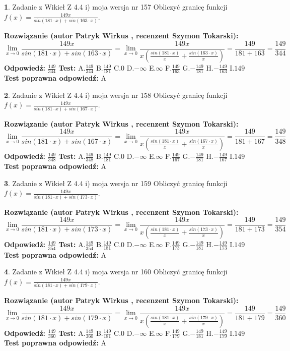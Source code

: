 \documentclass[12pt, a4paper]{article}
\theoremstyle{definition} %
\newtheorem{zad}{}
\newcommand{\zadStart}[1]{\begin{zad}#1\newline}
\newcommand{\zadStop}{\end{zad}}
\newcommand{\rozwStart}[2]{\noindent \textbf{Rozwiązanie (autor #1 , recenzent #2): }\newline}
\newcommand{\rozwStop}{\newline}
\newcommand{\odpStart}{\noindent \textbf{Odpowiedź:}\newline}
\newcommand{\odpStop}{\newline}
\newcommand{\testStart}{\noindent \textbf{Test:}\newline}
\newcommand{\testStop}{\newline}
\newcommand{\kluczStart}{\noindent \textbf{Test poprawna odpowiedź:}\newline}
\newcommand{\kluczStop}{\newline}
\begin{document}
\zadStart{Zadanie z Wikieł Z 4.4 i) moja wersja nr 157}
Obliczyć granicę funkcji $f(x)=\frac{149x}{sin(181\cdot x) +sin(163\cdot x)}$.
\zadStop
\rozwStart{Patryk Wirkus}{Szymon Tokarski}
$$\lim\limits_{x\to 0}\frac{149x}{sin(181\cdot x) +sin(163\cdot x)}=\lim\limits_{x\to 0}\frac{149x}{x(\frac{sin(181\cdot x)}{x}+\frac{sin(163\cdot x)}{x})}=\frac{149}{181+163} = \frac{149}{344}$$
\rozwStop
\odpStart
$\frac{149}{344}$
\odpStop
\testStart
A.$\frac{149}{344}$
B.$\frac{149}{181}$
C.$0$
D.$-\infty$
E.$\infty$
F.$\frac{149}{163}$
G.$-\frac{149}{181}$
H.$-\frac{149}{163}$
I.$149$
\testStop
\kluczStart
A
\kluczStop



\zadStart{Zadanie z Wikieł Z 4.4 i) moja wersja nr 158}
Obliczyć granicę funkcji $f(x)=\frac{149x}{sin(181\cdot x) +sin(167\cdot x)}$.
\zadStop
\rozwStart{Patryk Wirkus}{Szymon Tokarski}
$$\lim\limits_{x\to 0}\frac{149x}{sin(181\cdot x) +sin(167\cdot x)}=\lim\limits_{x\to 0}\frac{149x}{x(\frac{sin(181\cdot x)}{x}+\frac{sin(167\cdot x)}{x})}=\frac{149}{181+167} = \frac{149}{348}$$
\rozwStop
\odpStart
$\frac{149}{348}$
\odpStop
\testStart
A.$\frac{149}{348}$
B.$\frac{149}{181}$
C.$0$
D.$-\infty$
E.$\infty$
F.$\frac{149}{167}$
G.$-\frac{149}{181}$
H.$-\frac{149}{167}$
I.$149$
\testStop
\kluczStart
A
\kluczStop



\zadStart{Zadanie z Wikieł Z 4.4 i) moja wersja nr 159}
Obliczyć granicę funkcji $f(x)=\frac{149x}{sin(181\cdot x) +sin(173\cdot x)}$.
\zadStop
\rozwStart{Patryk Wirkus}{Szymon Tokarski}
$$\lim\limits_{x\to 0}\frac{149x}{sin(181\cdot x) +sin(173\cdot x)}=\lim\limits_{x\to 0}\frac{149x}{x(\frac{sin(181\cdot x)}{x}+\frac{sin(173\cdot x)}{x})}=\frac{149}{181+173} = \frac{149}{354}$$
\rozwStop
\odpStart
$\frac{149}{354}$
\odpStop
\testStart
A.$\frac{149}{354}$
B.$\frac{149}{181}$
C.$0$
D.$-\infty$
E.$\infty$
F.$\frac{149}{173}$
G.$-\frac{149}{181}$
H.$-\frac{149}{173}$
I.$149$
\testStop
\kluczStart
A
\kluczStop



\zadStart{Zadanie z Wikieł Z 4.4 i) moja wersja nr 160}
Obliczyć granicę funkcji $f(x)=\frac{149x}{sin(181\cdot x) +sin(179\cdot x)}$.
\zadStop
\rozwStart{Patryk Wirkus}{Szymon Tokarski}
$$\lim\limits_{x\to 0}\frac{149x}{sin(181\cdot x) +sin(179\cdot x)}=\lim\limits_{x\to 0}\frac{149x}{x(\frac{sin(181\cdot x)}{x}+\frac{sin(179\cdot x)}{x})}=\frac{149}{181+179} = \frac{149}{360}$$
\rozwStop
\odpStart
$\frac{149}{360}$
\odpStop
\testStart
A.$\frac{149}{360}$
B.$\frac{149}{181}$
C.$0$
D.$-\infty$
E.$\infty$
F.$\frac{149}{179}$
G.$-\frac{149}{181}$
H.$-\frac{149}{179}$
I.$149$
\testStop
\kluczStart
A
\kluczStop
\end{document}
